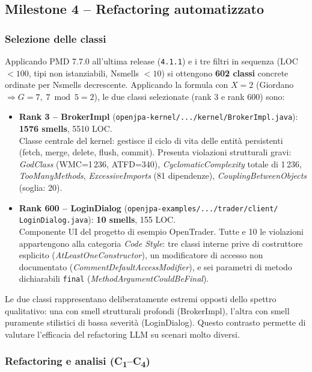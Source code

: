 \subsection{Milestone 4 -- Refactoring automatizzato}

\subsubsection{Selezione delle classi}

Applicando PMD 7.7.0 all'ultima release (\texttt{4.1.1}) e i tre filtri in sequenza
(LOC $< 100$, tipi non istanziabili, Nsmells $< 10$) si ottengono \textbf{602 classi}
concrete ordinate per Nsmells decrescente.
Applicando la formula con $X = 2$ (Giordano $\Rightarrow G = 7,\; 7 \bmod 5 = 2$),
le due classi selezionate (rank 3 e rank 600) sono:

\begin{itemize}
  \item \textbf{Rank 3 -- BrokerImpl} (\texttt{openjpa-kernel/.../kernel/BrokerImpl.java}):
        \textbf{1576 smells}, 5510 LOC.\\
        Classe centrale del kernel: gestisce il ciclo di vita delle entità persistenti
        (fetch, merge, delete, flush, commit). Presenta violazioni strutturali gravi:
        \textit{GodClass} (WMC=1\,236, ATFD=340), \textit{CyclomaticComplexity} totale
        di 1\,236, \textit{TooManyMethods}, \textit{ExcessiveImports} (81 dipendenze),
        \textit{CouplingBetweenObjects} (soglia: 20).

  \item \textbf{Rank 600 -- LoginDialog} (\texttt{openjpa-examples/.../trader/client/%
        LoginDialog.java}):
        \textbf{10 smells}, 155 LOC.\\
        Componente UI del progetto di esempio OpenTrader. Tutte e 10 le violazioni
        appartengono alla categoria \textit{Code Style}: tre classi interne prive di
        costruttore esplicito (\textit{AtLeastOneConstructor}),
        un modificatore di accesso non documentato (\textit{CommentDefaultAccessModifier}),
        e sei parametri di metodo dichiarabili \texttt{final}
        (\textit{MethodArgumentCouldBeFinal}).
\end{itemize}

Le due classi rappresentano deliberatamente estremi opposti dello spettro qualitativo:
una con smell strutturali profondi (BrokerImpl), l'altra con smell puramente stilistici
di bassa severità (LoginDialog). Questo contrasto permette di valutare l'efficacia del
refactoring LLM su scenari molto diversi.

\subsubsection{Refactoring e analisi (C\textsubscript{1}--C\textsubscript{4})}

